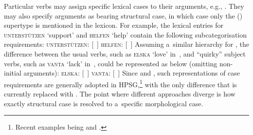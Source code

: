\documentclass[output=paper,biblatex,babelshorthands,newtxmath,draftmode,colorlinks,citecolor=brown]{langscibook}
\begin{document}
Particular verbs may assign specific lexical cases to their arguments, e.g., .  They may also specify arguments as bearing structural case, in which case only the () supertype is mentioned in the lexicon.  For example, the lexical entries for \textsc{unterstützen} `support’ and \textsc{helfen} `help’ contain the following subcategorisation requirements:
\eal
\label{ex:hmsubcats}
\ex \textsc{unterst\"utzen}: [~] 
\ex \textsc{helfen}: [~]
\zl
Assuming a~similar  hierarchy for , the difference between the usual verbs, such as \textsc{elska} `love’ in~, and “quirky” subject verbs, such as \textsc{vanta} `lack’ in~, could be represented as below (omitting non-initial arguments):
\eal
\label{ex:islsubcats}
\ex \textsc{elska}: [~] 
\ex \textsc{vanta}: [~]
\zl
Since \citet{Pollard94a} and \citet{HM94a}, such representations of case requirements are generally adopted in HPSG,\footnote{Recent examples being  and \textcites[Chapter~7.2.1]{MuellerLFGphrasal}.} with the only difference that  is currently replaced with .  The point where different approaches diverge is how exactly structural case is resolved to a~specific morphological case.
\end{document}
